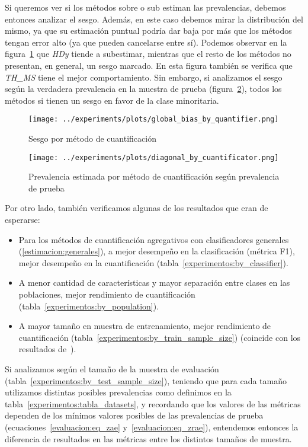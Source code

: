 Si queremos ver si los métodos sobre o sub estiman las prevalencias, debemos
entonces analizar el sesgo. Además, en este caso debemos mirar la distribución
del mismo, ya que su estimación puntual podría dar baja por más que los métodos
tengan error alto (ya que pueden cancelarse entre sí). Podemos observar en la
figura~\ref{fig:global_bias_by_quantifier} que {\it HDy\/} tiende a subestimar,
mientras que el resto de los métodos no presentan, en general, un sesgo marcado.
En esta figura también se verifica que {\it TH\_MS} tiene el mejor
comportamiento. Sin embargo, si analizamos el sesgo según la verdadera
prevalencia en la muestra de prueba
(figura~\ref{fig:diagonal_by_cuantificator}), todos los métodos si tienen un
sesgo en favor de la clase minoritaria.

\begin{figure}[H]
    \centering
    \centerline{\texttt{[image: ../experiments/plots/global\_bias\_by\_quantifier.png]}}
    \caption{Sesgo por método de
    cuantificación}\label{fig:global_bias_by_quantifier}
\end{figure}
\begin{figure}[H]
    \centering
    \centerline{\texttt{[image: ../experiments/plots/diagonal\_by\_cuantificator.png]}}
    \caption{Prevalencia estimada por método de cuantificación según prevalencia
    de prueba}\label{fig:diagonal_by_cuantificator}
\end{figure}

Por otro lado, también verificamos algunas de los resultados que eran de
esperarse:
\begin{itemize}
    \item Para los métodos de cuantificación agregativos con clasificadores
    generales (\ref{estimacion:generales}), a mejor desempeño en la
    clasificación (métrica F1), mejor desempeño en la cuantificación
    (tabla~\ref{experimentos:by_classifier}).
    \item A menor cantidad de características y mayor separación entre clases en
    las poblaciones, mejor rendimiento de cuantificación
    (tabla~\ref{experimentos:by_population}).
    \item A mayor tamaño en muestra de entrenamiento, mejor rendimiento de
    cuantificación (tabla~\ref{experimentos:by_train_sample_size}) (coincide con
    los resultados de~\citet{schumacher2021comparative}).
\end{itemize}

Si analizamos según el tamaño de la muestra de evaluación
(tabla~\ref{experimentos:by_test_sample_size}), teniendo que para cada tamaño
utilizamos distintas posibles prevalencias como definimos en la
tabla~\ref{experimentos:tabla_datasets}, y recordando que los valores de las
métricas dependen de los mínimos valores posibles de las prevalencias de prueba
(ecuaciones~\ref{evaluacion:eq_zae} y~\ref{evaluacion:eq_zrae}), entendemos
entonces la diferencia de resultados en las métricas entre los distintos tamaños
de muestra.

